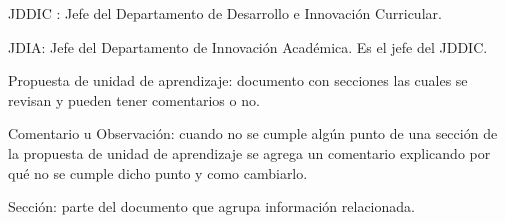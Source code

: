 JDDIC : Jefe del Departamento de Desarrollo e Innovación Curricular.

JDIA: Jefe del Departamento de Innovación Académica. Es el jefe del JDDIC.

Propuesta de unidad de aprendizaje: documento con secciones las cuales se revisan y pueden tener comentarios o no.

Comentario u Observación: cuando no se cumple algún punto de una sección de la propuesta de unidad de aprendizaje se agrega un comentario explicando por qué no se cumple dicho punto y como cambiarlo.

Sección: parte del documento que agrupa información relacionada.

